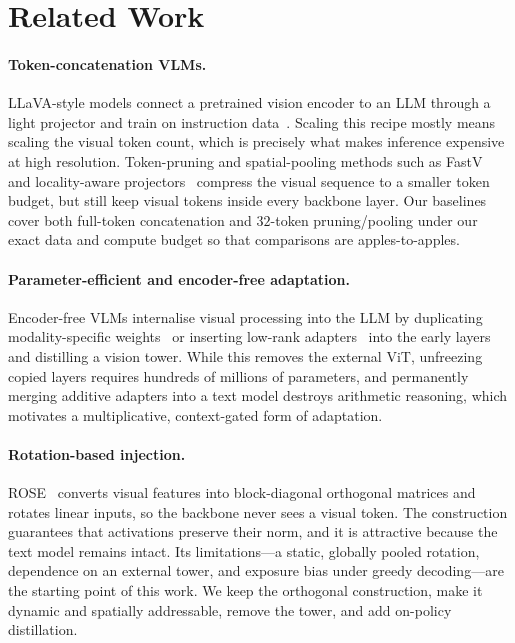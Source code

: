 \documentclass[10pt,twocolumn,letterpaper]{article}
\begin{document}
\section{Related Work}
\label{sec:related}

\paragraph{Token-concatenation VLMs.}
LLaVA-style models connect a pretrained vision encoder to an LLM through a
light projector and train on instruction data~\citep{liu2023llava,
liu2024improved}. Scaling this recipe mostly means scaling the visual token
count, which is precisely what makes inference expensive at high resolution.
Token-pruning and spatial-pooling methods such as FastV~\citep{chen2024fastv}
and locality-aware projectors~\citep{cha2024honeybee} compress the visual sequence
to a smaller token budget, but still keep visual tokens inside every backbone layer.
Our baselines cover both full-token concatenation and $32$-token pruning/pooling
under our exact data and compute budget so that comparisons are apples-to-apples.

\paragraph{Parameter-efficient and encoder-free adaptation.}
Encoder-free VLMs internalise visual processing into the LLM by duplicating
modality-specific weights~\citep{diao2024eve} or inserting low-rank
adapters~\citep{hu2021lora,vora2025} into the early layers and distilling a
vision tower. While this removes the external ViT, unfreezing copied layers
requires hundreds of millions of parameters, and permanently merging additive
adapters into a text model destroys arithmetic reasoning, which motivates a
multiplicative, context-gated form of adaptation.

\paragraph{Rotation-based injection.}
ROSE~\citep{rose2025} converts visual features into block-diagonal orthogonal
matrices and rotates linear inputs, so the backbone never sees a visual token.
The construction guarantees that activations preserve their norm, and it is
attractive because the text model remains intact. Its limitations---a static,
globally pooled rotation, dependence on an external tower, and exposure bias
under greedy decoding---are the starting point of this work. We keep the
orthogonal construction, make it dynamic and spatially addressable, remove the
tower, and add on-policy distillation.
\end{document}
